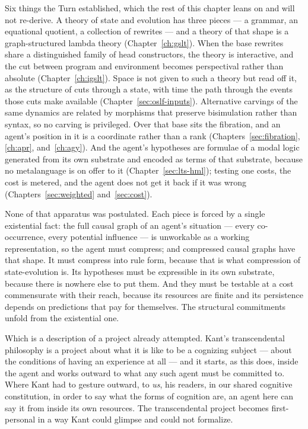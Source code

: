 Six things the Turn established, which the rest of this chapter
leans on and will not re-derive.
A theory of state and evolution has three pieces --- a grammar, an
equational quotient, a collection of rewrites --- and a theory of
that shape is a graph-structured lambda theory
(Chapter~\ref{ch:gslt}).
When the base rewrites share a distinguished family of head
constructors, the theory is interactive, and the cut between
program and environment becomes perspectival rather than absolute
(Chapter~\ref{ch:igslt}).
Space is not given to such a theory but read off it, as the
structure of cuts through a state, with time the path through the
events those cuts make available (Chapter~\ref{sec:oslf-inputs}).
Alternative carvings of the same dynamics are related by morphisms
that preserve bisimulation rather than syntax, so no carving is
privileged.
Over that base sits the fibration, and an agent's position in it is
a coordinate rather than a rank
(Chapters~\ref{sec:fibration}, \ref{ch:apr}, and~\ref{ch:agy}).
And the agent's hypotheses are formulae of a modal logic generated
from its own substrate and encoded as terms of that substrate,
because no metalanguage is on offer to it
(Chapter~\ref{sec:lts-hml}); testing one costs, the cost is
metered, and the agent does not get it back if it was wrong
(Chapters~\ref{sec:weighted} and~\ref{sec:cost}).

None of that apparatus was postulated.
Each piece is forced by a single existential fact: the full causal
graph of an agent's situation --- every co-occurrence, every
potential influence --- is unworkable as a working representation,
so the agent must compress; and compressed causal graphs have that
shape.
It must compress into rule form, because that is what compression
of state-evolution is.
Its hypotheses must be expressible in its own substrate, because
there is nowhere else to put them.
And they must be testable at a cost commensurate with their reach,
because its resources are finite and its persistence depends on
predictions that pay for themselves.
The structural commitments unfold from the existential one.

Which is a description of a project already attempted.
Kant's transcendental philosophy is a project about what it is like
to be a cognizing subject --- about the conditions of having an
experience at all --- and it starts, as this does, inside the agent
and works outward to what any such agent must be committed to.
Where Kant had to gesture outward, to \emph{us}, his readers, in
our shared cognitive constitution, in order to say what the forms
of cognition are, an agent here can say it from inside its own
resources.
The transcendental project becomes first-personal in a way Kant
could glimpse and could not formalize.

